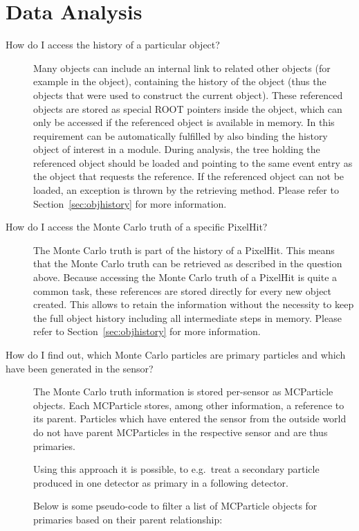 \section{Data Analysis}
\begin{description}
\item[How do I access the history of a particular object?]
Many objects can include an internal link to related other objects (for example  in the  object), containing the history of the object (thus the objects that were used to construct the current object).
These referenced objects are stored as special ROOT pointers inside the object, which can only be accessed if the referenced object is available in memory.
In \apsq this requirement can be automatically fulfilled by also binding the history object of interest in a module.
During analysis, the tree holding the referenced object should be loaded and pointing to the same event entry as the object that requests the reference.
If the referenced object can not be loaded, an exception is thrown by the retrieving method.
Please refer to Section~\ref{sec:objhistory} for more information.
\item[How do I access the Monte Carlo truth of a specific PixelHit?]
The Monte Carlo truth is part of the history of a PixelHit.
This means that the Monte Carlo truth can be retrieved as described in the question above.
Because accessing the Monte Carlo truth of a PixelHit is quite a common task, these references are stored directly for every new object created.
This allows to retain the information without the necessity to keep the full object history including all intermediate steps in memory.
Please refer to Section~\ref{sec:objhistory} for more information.
\item[How do I find out, which Monte Carlo particles are primary particles and which have been generated in the sensor?]
The Monte Carlo truth information is stored per-sensor as MCParticle objects. Each MCParticle stores, among other information, a reference to its parent. Particles which have entered the sensor from the outside world do not have parent MCParticles in the respective sensor and are thus primaries.

Using this approach it is possible, to e.g.\ treat a secondary particle produced in one detector as primary in a following detector.

Below is some pseudo-code to filter a list of MCParticle objects for primaries based on their parent relationship:


\end{description}
